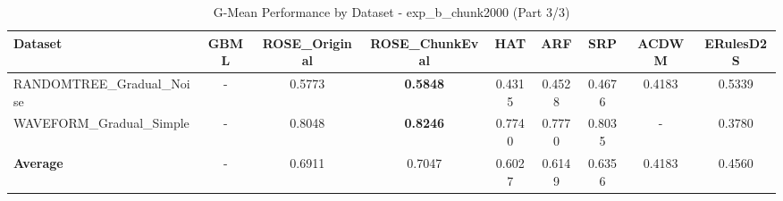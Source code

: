 \begin{table}[htbp]
\centering
\caption{G-Mean Performance by Dataset - exp_b_chunk2000 (Part 3/3)}
\label{tab:gmean_exp_b_chunk2000_3}
\footnotesize
\begin{tabular}{lcccccccc}
\toprule
Dataset & GBML & ROSE_Original & ROSE_ChunkEval & HAT & ARF & SRP & ACDWM & ERulesD2S \\
\midrule
RANDOMTREE_Gradual_Noise & - & 0.5773 & \textbf{0.5848} & 0.4315 & 0.4528 & 0.4676 & 0.4183 & 0.5339 \\
WAVEFORM_Gradual_Simple & - & 0.8048 & \textbf{0.8246} & 0.7740 & 0.7770 & 0.8035 & - & 0.3780 \\
\midrule
\textbf{Average} & - & 0.6911 & 0.7047 & 0.6027 & 0.6149 & 0.6356 & 0.4183 & 0.4560 \\
\bottomrule
\end{tabular}
\end{table}